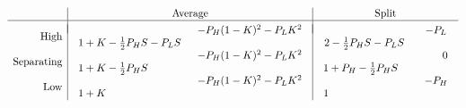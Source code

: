 \documentclass[a4paper,10pt]{article}
\numberwithin{equation}{section}
\begin{document}
\begin{table}[h]
\begin{center}
\[
\begin{array}{r|c|c}
& \text{Average} & \text{Split}\\
\hline
&&\\[-.3cm]
 \text{High} & 
\begin{array}{ll}
\hspace{3.6cm} & -P_H (1-K)^2-P_L K^2 \\
 1+K-\frac{1}{2}P_H S-P_L S& 
\end{array}
 & 
\begin{array}{ll}
\hspace{3cm} & -P_L \\
 2-\frac{1}{2}P_H S-P_L S& 
\end{array}
\\
 \text{Separating} & 
\begin{array}{ll}
\hspace{3.6cm} & -P_H (1-K)^2-P_L K^2 \\
 1+K- \frac{1}{2}P_H S & 
\end{array}
 & 
\begin{array}{ll}
\hspace{3.6cm} & 0 \\
1+P_H-\frac{1}{2}P_H S & 
\end{array}
 \\
\text{Low} & 
\begin{array}{ll}
\hspace{3.6cm} & -P_H (1-K)^2-P_L K^2 \\
 1+K &
\end{array}
 & 
\begin{array}{ll}
\hspace{3cm} & -P_H \\
 1 & 
\end{array}
\end{array}
\]
\end{center}
\caption{Pay-off matrix of the infinite strategy space}
\label{tab:PayoffMatrix3D1}
\end{table}
\end{document}
